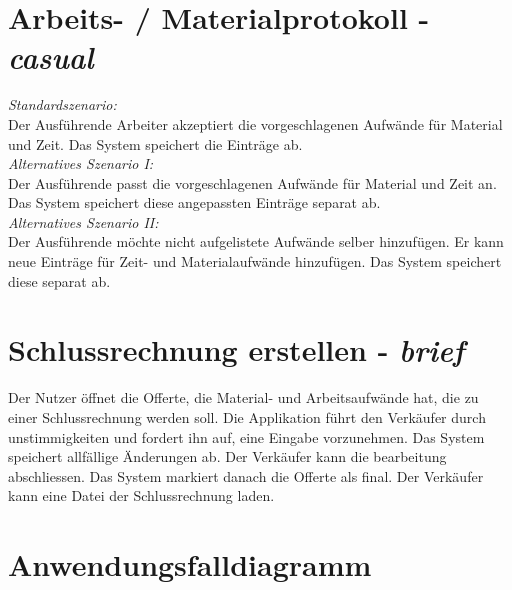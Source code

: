 \documentclass[a4paper,12pt]{article}
\begin{document}
	\newpage
	\section{Arbeits- / Materialprotokoll  - \emph{casual}}
		\emph{Standardszenario:} \\
		Der Ausführende Arbeiter akzeptiert die vorgeschlagenen Aufwände für Material
		und Zeit. Das System speichert die Einträge ab.\\
		\emph{Alternatives Szenario I:}\\
		Der Ausführende passt die vorgeschlagenen Aufwände für Material und Zeit an.
		Das System speichert diese angepassten Einträge separat ab.\\	
		\emph{Alternatives Szenario II:}\\
		Der Ausführende möchte nicht aufgelistete Aufwände selber hinzufügen. Er kann neue
		Einträge für Zeit- und Materialaufwände hinzufügen. Das System speichert diese separat ab.
	\newpage
	\section{Schlussrechnung erstellen - \emph{brief}}
		Der Nutzer öffnet die Offerte, die Material- und Arbeitsaufwände hat,
		die zu einer Schlussrechnung werden soll. Die Applikation führt den Verkäufer durch
		unstimmigkeiten und fordert ihn auf, eine Eingabe vorzunehmen. Das System
		speichert allfällige Änderungen ab. Der Verkäufer kann die bearbeitung abschliessen.
		Das System markiert danach die Offerte als final. Der Verkäufer kann eine Datei der 
		Schlussrechnung laden.

	\newpage
	\section{Anwendungsfalldiagramm}
	\begin{center}
	\end{center}
\end{document}
